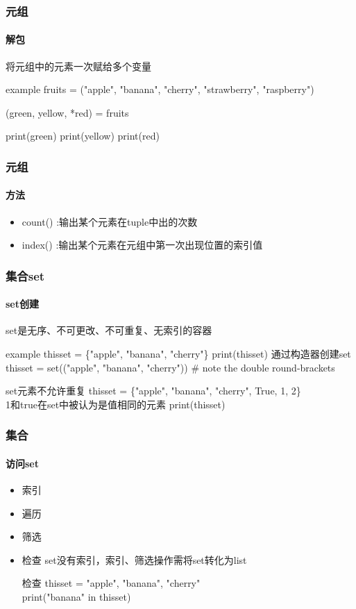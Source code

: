 \documentclass{beamer}
\begin{document}
\begin{frame}
	\frametitle{元组}
	\framesubtitle{解包}
	将元组中的元素一次赋给多个变量
	\begin{block}{example}
		fruits = ("apple", "banana", "cherry", "strawberry", "raspberry")

		(green, yellow, *red) = fruits

		print(green)
		print(yellow)
		print(red)
	\end{block}
\end{frame}
\begin{frame}[t]
	\frametitle{元组}
	\framesubtitle{方法}
	\begin{itemize}
		\item count() :输出某个元素在tuple中出的次数
		\item index() :输出某个元素在元组中第一次出现位置的索引值
	\end{itemize}

\end{frame}
\begin{frame}[t]
	\frametitle{集合set}
	\framesubtitle{set创建}
	set是无序、不可更改、不可重复、无索引的容器
	\begin{block}{example}
		thisset = \{"apple", "banana", "cherry"\}
		print(thisset)
		通过构造器创建set thisset = set(("apple", "banana", "cherry")) # note the double round-brackets
	\end{block}
	\begin{alertblock}{set元素不允许重复}
		thisset = \{"apple", "banana", "cherry", True, 1, 2\}\\1和true在set中被认为是值相同的元素
		print(thisset)
	\end{alertblock}
\end{frame}
\begin{frame}[t]
	\frametitle{集合}
	\framesubtitle{访问set}
	\begin{itemize}
		\item 索引
		\item 遍历
		\item 筛选
		\item 检查
		      set没有索引，索引、筛选操作需将set转化为list
		      \begin{block}{检查}
			      thisset = {"apple", "banana", "cherry"}\\
			      print("banana" in thisset)
		      \end{block}

	\end{itemize}
\end{frame}
\end{document}

